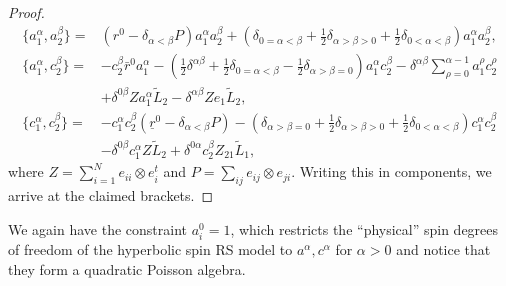 \begin{proof}
    \begin{align}
        \{ a_1^\alpha,a_2^\beta \} ={}& (r^0 - \delta_{\alpha<\beta} P) a_1^\alpha a_2^\beta + (\delta_{0=\alpha<\beta} + \tfrac{1}{2} \delta_{\alpha>\beta>0} + \tfrac{1}{2}\delta_{0<\alpha<\beta}) a_1^\alpha a_2^\beta,
        \\[6pt]
        \{ a_1^\alpha,c_2^\beta \} ={}& {-c_2^\beta} \bar r^0 a_1^\alpha - (\tfrac{1}{2} \delta^{\alpha\beta} + \tfrac{1}{2} \delta_{0=\alpha < \beta} - \tfrac{1}{2} \delta_{\alpha > \beta=0}) a_1^\alpha c_2^\beta - \delta^{\alpha\beta} \sum_{\rho=0}^{\alpha-1} a_1^\rho c_2^\rho \\
        &+ \delta^{0\beta} Z a_1^\alpha \tilde L_2 - \delta^{\alpha\beta} Z e_1 \tilde L_2, \nonumber
        \\[6pt]
        \{ c_1^\alpha,c_2^\beta \} ={}& {-c_1^\alpha} c_2^\beta (\underline r^0 - \delta_{\alpha<\beta} P) - (\delta_{\alpha>\beta=0} + \tfrac{1}{2} \delta_{\alpha>\beta>0} + \tfrac{1}{2} \delta_{0<\alpha<\beta}) c_1^\alpha c_2^\beta \\
        &- \delta^{0\beta} c_1^\alpha Z \tilde L_2 + \delta^{0\alpha} c_2^\beta Z_{21} \tilde L_1, \nonumber
    \end{align}
    where $Z = \sum_{i=1}^N e_{ii} \otimes e_i^t$ and $P = \sum_{ij} e_{ij} \otimes e_{ji}$. Writing this in components, we arrive at the claimed brackets.
\end{proof}

\begin{remark}
    We again have the constraint $a_i^0 = 1$, which restricts the ``physical'' spin degrees of freedom of the hyperbolic spin RS model to $a^\alpha,c^\alpha$ for $\alpha > 0$ and notice that they form a quadratic Poisson algebra.
\end{remark}

